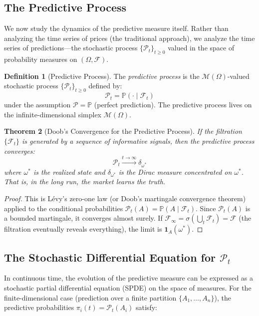 \documentclass[12pt,a4paper]{article}
\newtheorem{theorem}{Theorem}[section]
\theoremstyle{definition}
\newtheorem{definition}[theorem]{Definition}
\newcommand{\Prob}{\mathbb{P}}
\newcommand{\F}{\mathcal{F}}
\newcommand{\M}{\mathcal{M}}
\newcommand{\PP}{\mathcal{P}}
\begin{document}
\subsection{The Predictive Process}

We now study the dynamics of the predictive measure itself. Rather than analyzing the time series of prices (the traditional approach), we analyze the time series of predictions---the stochastic process $\{\PP_t\}_{t \geq 0}$ valued in the space of probability measures on $(\Omega, \F)$.

\begin{definition}[Predictive Process]\label{def:pred_process}
The \emph{predictive process} is the $\M(\Omega)$-valued stochastic process $\{\PP_t\}_{t \geq 0}$ defined by:
\begin{equation}
    \PP_t = \Prob(\cdot \mid \F_t)
\end{equation}
under the assumption $\PP = \Prob$ (perfect prediction). The predictive process lives on the infinite-dimensional simplex $\M(\Omega)$.
\end{definition}

\begin{theorem}[Doob's Convergence for the Predictive Process]\label{thm:doob}
If the filtration $\{\F_t\}$ is generated by a sequence of informative signals, then the predictive process converges:
\begin{equation}
    \PP_t \xrightarrow{t \to \infty} \delta_{\omega^*}
\end{equation}
where $\omega^*$ is the realized state and $\delta_{\omega^*}$ is the Dirac measure concentrated on $\omega^*$. That is, in the long run, the market learns the truth.
\end{theorem}

\begin{proof}
This is L\'{e}vy's zero-one law (or Doob's martingale convergence theorem) applied to the conditional probabilities $\PP_t(A) = \Prob(A \mid \F_t)$. Since $\PP_t(A)$ is a bounded martingale, it converges almost surely. If $\F_\infty = \sigma(\bigcup_t \F_t) = \F$ (the filtration eventually reveals everything), the limit is $\mathbf{1}_A(\omega^*)$.
\end{proof}

\subsection{The Stochastic Differential Equation for $\PP_t$}

In continuous time, the evolution of the predictive measure can be expressed as a stochastic partial differential equation (SPDE) on the space of measures. For the finite-dimensional case (prediction over a finite partition $\{A_1, \ldots, A_n\}$), the predictive probabilities $\pi_i(t) = \PP_t(A_i)$ satisfy:
\end{document}
